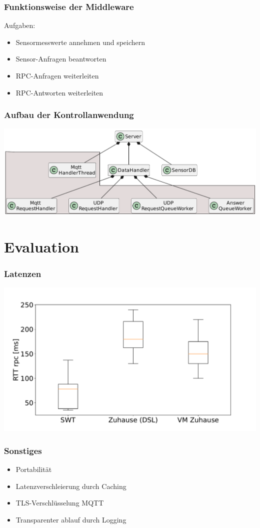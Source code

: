\documentclass{beamer}
\begin{document}
\begin{frame}
    \frametitle[]{Funktionsweise der Middleware}
    Aufgaben:
    \begin{itemize}
        \item Sensormesswerte annehmen und speichern
        \item Sensor-Anfragen beantworten
        \item RPC-Anfragen weiterleiten
        \item RPC-Antworten weiterleiten
    \end{itemize}
\end{frame}

\begin{frame}
\frametitle[]{Aufbau der Kontrollanwendung}
\includegraphics[width=\textwidth]{images/ServerUml.pdf}
\end{frame}


\section{Evaluation}
\begin{frame}
    \frametitle[]{Latenzen}
    \includegraphics[width=\textwidth]{images/latencies.pdf}
\end{frame}
\begin{frame}
    \frametitle[]{Sonstiges}
    \begin{itemize}
        \item Portabilität
        \item Latenzverschleierung durch Caching
        \item TLS-Verschlüsselung MQTT
        \item Transparenter ablauf durch Logging
    \end{itemize}
\end{frame}
\end{document}
